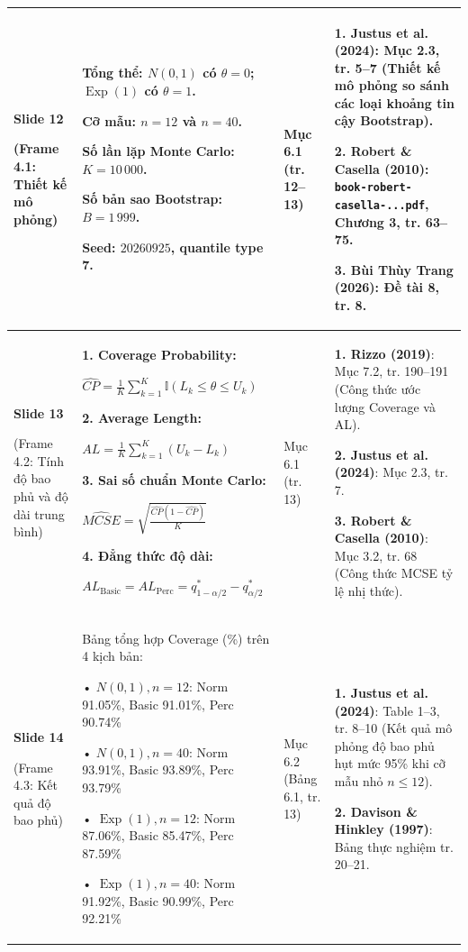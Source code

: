 \documentclass[10pt,a4paper]{article}
\begin{document}
\begin{longtable}{|>{\RaggedRight\arraybackslash}p{2.1cm}|>{\RaggedRight\arraybackslash}p{5.1cm}|>{\RaggedRight\arraybackslash}p{3.1cm}|>{\RaggedRight\arraybackslash}p{6.3cm}|}
\textbf{Slide 12}\par(Frame 4.1: Thiết kế mô phỏng) &
Tổng thể: $N(0,1)$ có $\theta=0$; $\operatorname{Exp}(1)$ có $\theta=1$.\par
Cỡ mẫu: $n=12$ và $n=40$.\par
Số lần lặp Monte Carlo: $K=10\,000$.\par
Số bản sao Bootstrap: $B=1\,999$.\par
Seed: $20260925$, quantile type 7. &
Mục 6.1 (tr. 12--13) &
\textbf{1. Justus et al. (2024)}: Mục 2.3, tr. 5--7 (Thiết kế mô phỏng so sánh các loại khoảng tin cậy Bootstrap).\par
\textbf{2. Robert \& Casella (2010)}: \texttt{book-robert-casella-...pdf}, Chương 3, tr. 63--75.\par
\textbf{3. Bùi Thùy Trang (2026)}: Đề tài 8, tr. 8. \\
\hline

\textbf{Slide 13}\par(Frame 4.2: Tính độ bao phủ và độ dài trung bình) &
\textbf{1. Coverage Probability:}\par
$\widehat{CP} = \frac{1}{K}\sum_{k=1}^K \mathbb{I}(L_k \le \theta \le U_k)$\par
\textbf{2. Average Length:}\par
$AL = \frac{1}{K}\sum_{k=1}^K (U_k - L_k)$\par
\textbf{3. Sai số chuẩn Monte Carlo:}\par
$\widehat{MCSE} = \sqrt{\frac{\widehat{CP}(1-\widehat{CP})}{K}}$\par
\textbf{4. Đẳng thức độ dài:}\par
$AL_{\text{Basic}} = AL_{\text{Perc}} = q_{1-\alpha/2}^* - q_{\alpha/2}^*$ &
Mục 6.1 (tr. 13) &
\textbf{1. Rizzo (2019)}: Mục 7.2, tr. 190--191 (Công thức ước lượng Coverage và AL).\par
\textbf{2. Justus et al. (2024)}: Mục 2.3, tr. 7.\par
\textbf{3. Robert \& Casella (2010)}: Mục 3.2, tr. 68 (Công thức MCSE tỷ lệ nhị thức). \\
\hline

\textbf{Slide 14}\par(Frame 4.3: Kết quả độ bao phủ) &
Bảng tổng hợp Coverage (\%) trên 4 kịch bản:\par
• $N(0,1), n=12$: Norm 91.05\%, Basic 91.01\%, Perc 90.74\%\par
• $N(0,1), n=40$: Norm 93.91\%, Basic 93.89\%, Perc 93.79\%\par
• $\operatorname{Exp}(1), n=12$: Norm 87.06\%, Basic 85.47\%, Perc 87.59\%\par
• $\operatorname{Exp}(1), n=40$: Norm 91.92\%, Basic 90.99\%, Perc 92.21\% &
Mục 6.2 (Bảng 6.1, tr. 13) &
\textbf{1. Justus et al. (2024)}: Table 1--3, tr. 8--10 (Kết quả mô phỏng độ bao phủ hụt mức 95\% khi cỡ mẫu nhỏ $n \le 12$).\par
\textbf{2. Davison \& Hinkley (1997)}: Bảng thực nghiệm tr. 20--21. \\
\hline


\end{longtable}
\end{document}

